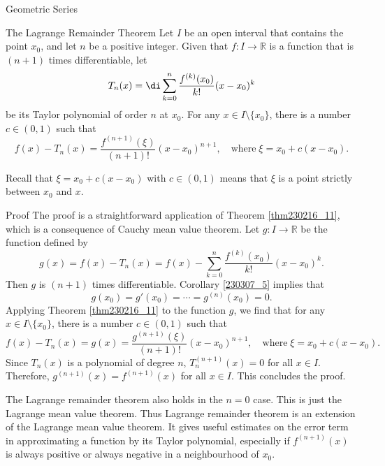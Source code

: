 \begin{example}[label=230305_16]{Geometric Series}
\begin{example}[label=230304_9]{}
\begin{example}{}
\begin{theorem}{The Lagrange Remainder Theorem}
Let $I$ be an open interval that contains the point $x_0$, and let $n$ be a positive integer. Given that $f:I\to\mathbb{R}$   is a function that is $(n+1)$ times differentiable, let \[T_n(x)=\di\sum_{k=0}^n\frac{f^{(k)}(x_0)}{k!}(x-x_0)^k\]be its Taylor polynomial of order $n$ at $x_0$. For any $x\in I\setminus \{x_0\}$, there is a number $c\in (0,1)$ such that
\[f(x)-T_n(x)=\frac{f^{(n+1)}(\xi)}{(n+1)!}(x-x_0)^{n+1},\quad\text{where}\;\xi=x_0+c(x-x_0).\]
\end{theorem}Recall that $\xi=x_0+c(x-x_0)$ with $c\in (0,1)$ means that $\xi$ is a point strictly between $x_0$ and $x$. 
\begin{myproof}{Proof}
The proof   is   a straightforward application of Theorem \ref{thm230216_11}, which is a consequence of Cauchy mean value theorem.
Let $g:I\to\mathbb{R}$ be the function defined by
\[g(x)=f(x)-T_n(x)=f(x)-\sum_{k=0}^n\frac{f^{(k)}(x_0)}{k!}(x-x_0)^k.\]Then $g$ is $(n+1)$ times differentiable. Corollary \ref{230307_5} implies that
\[g(x_0)=g'(x_0)=\cdots=g^{(n)}(x_0)=0.\]\bp
Applying Theorem \ref{thm230216_11} to the function $g$, we find that for any $x\in I\setminus \{x_0\}$, there is a number $c\in (0,1)$ such that
\[f(x)-T_n(x)=g(x)=\frac{g^{(n+1)}(\xi)}{(n+1)!}(x-x_0)^{n+1},\quad\text{where}\;\xi=x_0+c(x-x_0).\]  Since $T_n(x)$ is a polynomial of degree $n$, $T_n^{(n+1)}(x)=0$ for all $x\in I$. Therefore, $g^{(n+1)}(x)=f^{(n+1)}(x)$ for all $x\in I$. This concludes the proof.
\end{myproof}
The Lagrange remainder theorem also holds in the $n=0$ case. This is just 
the
Lagrange mean value theorem. Thus Lagrange remainder theorem is an extension of the Lagrange mean value theorem. It gives   useful estimates on the error term in approximating a function by its Taylor polynomial, especially if $f^{(n+1)}(x)$ is always positive or always negative in a neighbourhood of $x_0$.


\end{example}
\end{example}
\end{example}
